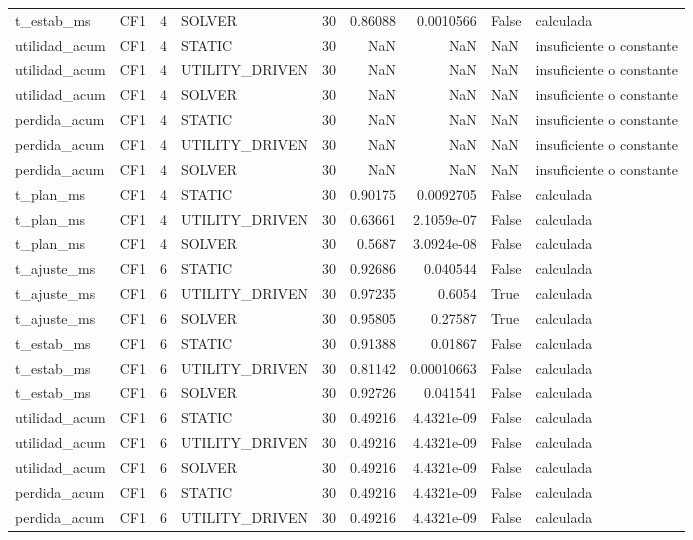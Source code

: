 \begin{tabular}{llrlrrrll}
t_estab_ms & CF1 & 4 & SOLVER & 30 & 0.86088 & 0.0010566 & False & calculada \\
utilidad_acum & CF1 & 4 & STATIC & 30 & NaN & NaN & NaN & insuficiente o constante \\
utilidad_acum & CF1 & 4 & UTILITY_DRIVEN & 30 & NaN & NaN & NaN & insuficiente o constante \\
utilidad_acum & CF1 & 4 & SOLVER & 30 & NaN & NaN & NaN & insuficiente o constante \\
perdida_acum & CF1 & 4 & STATIC & 30 & NaN & NaN & NaN & insuficiente o constante \\
perdida_acum & CF1 & 4 & UTILITY_DRIVEN & 30 & NaN & NaN & NaN & insuficiente o constante \\
perdida_acum & CF1 & 4 & SOLVER & 30 & NaN & NaN & NaN & insuficiente o constante \\
t_plan_ms & CF1 & 4 & STATIC & 30 & 0.90175 & 0.0092705 & False & calculada \\
t_plan_ms & CF1 & 4 & UTILITY_DRIVEN & 30 & 0.63661 & 2.1059e-07 & False & calculada \\
t_plan_ms & CF1 & 4 & SOLVER & 30 & 0.5687 & 3.0924e-08 & False & calculada \\
t_ajuste_ms & CF1 & 6 & STATIC & 30 & 0.92686 & 0.040544 & False & calculada \\
t_ajuste_ms & CF1 & 6 & UTILITY_DRIVEN & 30 & 0.97235 & 0.6054 & True & calculada \\
t_ajuste_ms & CF1 & 6 & SOLVER & 30 & 0.95805 & 0.27587 & True & calculada \\
t_estab_ms & CF1 & 6 & STATIC & 30 & 0.91388 & 0.01867 & False & calculada \\
t_estab_ms & CF1 & 6 & UTILITY_DRIVEN & 30 & 0.81142 & 0.00010663 & False & calculada \\
t_estab_ms & CF1 & 6 & SOLVER & 30 & 0.92726 & 0.041541 & False & calculada \\
utilidad_acum & CF1 & 6 & STATIC & 30 & 0.49216 & 4.4321e-09 & False & calculada \\
utilidad_acum & CF1 & 6 & UTILITY_DRIVEN & 30 & 0.49216 & 4.4321e-09 & False & calculada \\
utilidad_acum & CF1 & 6 & SOLVER & 30 & 0.49216 & 4.4321e-09 & False & calculada \\
perdida_acum & CF1 & 6 & STATIC & 30 & 0.49216 & 4.4321e-09 & False & calculada \\
perdida_acum & CF1 & 6 & UTILITY_DRIVEN & 30 & 0.49216 & 4.4321e-09 & False & calculada \\

\end{tabular}
